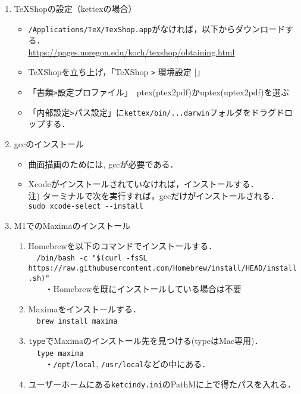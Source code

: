 \documentclass{ujarticle}
\begin{document}
\begin{enumerate}[\bf\large 1.]
\begin{enumerate}[(1)]
\item TeXShopの設定（kettexの場合）
  \begin{itemize}
  \item \verb|/Applications/TeX/TexShop.app|がなければ，以下からダウンロードする．\\
  \hspace*{5mm}\url{https://pages.uoregon.edu/koch/texshop/obtaining.html}
  \item TeXShopを立ち上げ，「TeXShop \verb|>| 環境設定 |」
  \item 「書類\verb|>|設定プロファイル」　ptex(ptex2pdf)かuptex(uptex2pdf)を選ぶ
  \item 「内部設定\verb|>|パス設定」に\verb|kettex/bin/...darwin|フォルダをドラグドロップする．
  \end{itemize}

\item gccのインストール
  \begin{itemize}
    \item 曲面描画のためには, gccが必要である．
    \item Xcodeがインストールされていなければ，インストールする．\\
    \hspace*{5mm}注) ターミナルで次を実行すれば，gccだけがインストールされる．\\
    \hspace*{20mm}\verb|sudo xcode-select --install|
  \end{itemize}

\item M1でのMaximaのインストール
  \begin{enumerate}[(1)]
    \item Homebrewを以下のコマンドでインストールする．\\
　{\small \verb|/bin/bash -c "$(curl -fsSL https://raw.githubusercontent.com/Homebrew/install/HEAD/install.sh)"|}\\
　　・Homebrewを既にインストールしている場合は不要
\item Maximaをインストールする．\\
　\verb|brew install maxima|
\item \verb|type|でMaximaのインストール先を見つける(typeはMac専用)．\\
　\verb|type maxima|\\
　　・\verb|/opt/local|, \verb|/usr/local|などの中にある．
\item ユーザーホームにある\verb|ketcindy.ini|のPathMに上で得たパスを入れる．
  \end{enumerate}


\end{enumerate}
\end{enumerate}
\end{document}
